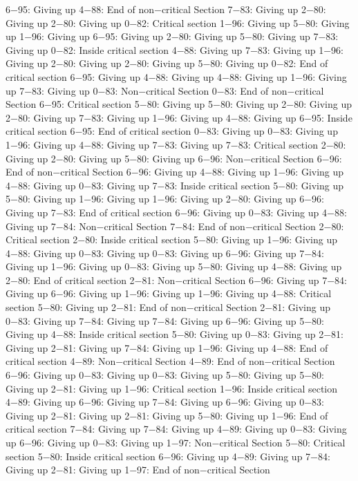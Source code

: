 6−95: Giving up
4−88: End of non−critical Section
7−83: Giving up
2−80: Giving up
2−80: Giving up
0−82: Critical section
1−96: Giving up
5−80: Giving up
1−96: Giving up
6−95: Giving up
2−80: Giving up
5−80: Giving up
7−83: Giving up
0−82: Inside critical section
4−88: Giving up
7−83: Giving up
1−96: Giving up
2−80: Giving up
2−80: Giving up
5−80: Giving up
0−82: End of critical section
6−95: Giving up
4−88: Giving up
4−88: Giving up
1−96: Giving up
7−83: Giving up
0−83: Non−critical Section
0−83: End of non−critical Section
6−95: Critical section
5−80: Giving up
5−80: Giving up
2−80: Giving up
2−80: Giving up
7−83: Giving up
1−96: Giving up
4−88: Giving up
6−95: Inside critical section
6−95: End of critical section
0−83: Giving up
0−83: Giving up
1−96: Giving up
4−88: Giving up
7−83: Giving up
7−83: Critical section
2−80: Giving up
2−80: Giving up
5−80: Giving up
6−96: Non−critical Section
6−96: End of non−critical Section
6−96: Giving up
4−88: Giving up
1−96: Giving up
4−88: Giving up
0−83: Giving up
7−83: Inside critical section
5−80: Giving up
5−80: Giving up
1−96: Giving up
1−96: Giving up
2−80: Giving up
6−96: Giving up
7−83: End of critical section
6−96: Giving up
0−83: Giving up
4−88: Giving up
7−84: Non−critical Section
7−84: End of non−critical Section
2−80: Critical section
2−80: Inside critical section
5−80: Giving up
1−96: Giving up
4−88: Giving up
0−83: Giving up
0−83: Giving up
6−96: Giving up
7−84: Giving up
1−96: Giving up
0−83: Giving up
5−80: Giving up
4−88: Giving up
2−80: End of critical section
2−81: Non−critical Section
6−96: Giving up
7−84: Giving up
6−96: Giving up
1−96: Giving up
1−96: Giving up
4−88: Critical section
5−80: Giving up
2−81: End of non−critical Section
2−81: Giving up
0−83: Giving up
7−84: Giving up
7−84: Giving up
6−96: Giving up
5−80: Giving up
4−88: Inside critical section
5−80: Giving up
0−83: Giving up
2−81: Giving up
2−81: Giving up
7−84: Giving up
1−96: Giving up
4−88: End of critical section
4−89: Non−critical Section
4−89: End of non−critical Section
6−96: Giving up
0−83: Giving up
0−83: Giving up
5−80: Giving up
5−80: Giving up
2−81: Giving up
1−96: Critical section
1−96: Inside critical section
4−89: Giving up
6−96: Giving up
7−84: Giving up
6−96: Giving up
0−83: Giving up
2−81: Giving up
2−81: Giving up
5−80: Giving up
1−96: End of critical section
7−84: Giving up
7−84: Giving up
4−89: Giving up
0−83: Giving up
6−96: Giving up
0−83: Giving up
1−97: Non−critical Section
5−80: Critical section
5−80: Inside critical section
6−96: Giving up
4−89: Giving up
7−84: Giving up
2−81: Giving up
1−97: End of non−critical Section
